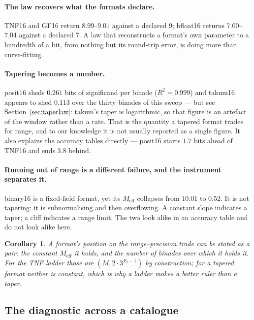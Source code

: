 \documentclass[11pt]{article}
\newtheorem{corollary}{Corollary}
\theoremstyle{definition}
\begin{document}
\paragraph{The law recovers what the formats declare.} TNF16 and GF16 return
$8.99$--$9.01$ against a declared 9; bfloat16 returns $7.00$--$7.04$ against a
declared 7. A law that reconstructs a format's own parameter to a hundredth of a
bit, from nothing but its round-trip error, is doing more than curve-fitting.

\paragraph{Tapering becomes a number.} posit16 sheds $0.261$ bits of significand
per binade ($R^2 = 0.999$) and takum16 appears to shed $0.113$ over the thirty
binades of this sweep --- but see Section~\ref{sec:taperlaw}: takum's taper is
logarithmic, so that figure is an artefact of the window rather than a rate. That is the
quantity a tapered format trades for range, and to our knowledge it is not usually
reported as a single figure. It also explains the accuracy tables directly ---
posit16 starts $1.7$ bits ahead of TNF16 and ends $3.8$ behind.

\paragraph{Running out of range is a different failure, and the instrument
separates it.} binary16 is a fixed-field format, yet its $M_{\mathrm{eff}}$
collapses from $10.01$ to $0.52$. It is not tapering: it is subnormalising and
then overflowing. A constant slope indicates a taper; a cliff indicates a range
limit. The two look alike in an accuracy table and do not look alike here.

\begin{corollary}
A format's position on the range--precision trade can be stated as a pair: the
constant $M_{\mathrm{eff}}$ it holds, and the number of binades over which it
holds it. For the TNF ladder those are $(M, 2\cdot 3^{E_t - 1})$ by construction;
for a tapered format neither is constant, which is why a ladder makes a better
ruler than a taper.
\end{corollary}


\subsection{The diagnostic across a catalogue}\label{sec:catalogue}
\end{document}
